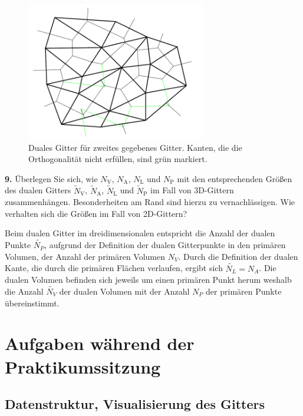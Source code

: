\documentclass[Protokollheft.tex]{subfiles}
\begin{document}
\begin{figure}[h]
	\centering
	\includegraphics[width=0.7\textwidth]{Duales_Gitter_2.png}
	\caption{Duales Gitter für zweites gegebenes Gitter. Kanten, die die Orthogonalität nicht erfüllen, sind grün markiert.}
	\label{Abb:dual_2}
\end{figure}

        \begin{framed}
	\noindent \textbf{9.}
        Überlegen Sie sich, wie $N_\text{V}$, $N_\text{A}$, $N_\text{L}$ und $N_\text{P}$
        mit den entsprechenden Größen des dualen Gitters $\widetilde N_\text{V}$,
        $\widetilde N_\text{A}$, $\widetilde N_\text{L}$ und $\widetilde N_\text{P}$ im Fall
        von 3D-Gittern zusammenhängen. Besonderheiten am Rand sind hierzu zu vernachlässigen.
        Wie verhalten sich die Größen im Fall von 2D-Gittern?\label{exer:primaryDualCorrespondence}
\end{framed}

Beim dualen Gitter im dreidimensionalen entspricht die Anzahl der dualen Punkte $\tilde{N_P}$, aufgrund der Definition der dualen Gitterpunkte in den primären Volumen, der Anzahl der primären Volumen ${N_V}$. Durch die Definition der dualen Kante, die durch die primären Flächen verlaufen, ergibt sich $\tilde{N_L} = N_A$. Die dualen Volumen befinden sich jeweils um einen primären Punkt herum weshalb die Anzahl $\tilde{N_V}$ der dualen Volumen mit der Anzahl $N_P$ der primären Punkte übereinstimmt.  
\section{Aufgaben während der Praktikumssitzung}

    {\subsection{Datenstruktur, Visualisierung des Gitters}}
\end{document}
